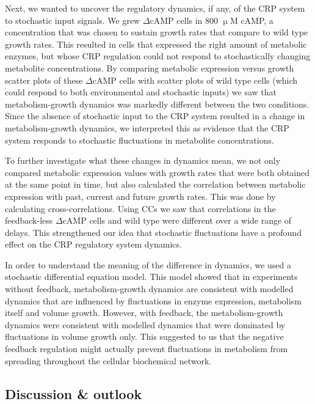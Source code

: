 Next, we wanted to 
uncover
the regulatory dynamics, if any, of the CRP system to stochastic input signals.
%
We grew  $\Delta$cAMP cells in 800 $\upmu$M cAMP,
a concentration that was chosen to sustain growth rates that compare to wild type growth rates.
%
This resulted in cells that expressed the right amount of metabolic enzymes, 
but whose CRP regulation could not respond to stochastically changing metabolite concentrations.
%
By comparing metabolic expression versus growth scatter plots of these $\Delta$cAMP cells with
scatter plots of wild type cells (which could respond to both environmental and stochastic inputs)  
we saw that metabolism-growth dynamics was markedly different between the two conditions.
%
Since the absence 
of stochastic input to the CRP system resulted in a change in metabolism-growth dynamics, 
we interpreted this as evidence that the CRP system responds to stochastic fluctuations in metabolite concentrations.

To further investigate what these changes in dynamics mean, 
we not only compared metabolic expression values with growth rates that were both obtained at the same point in time,
but also calculated the correlation between metabolic expression with past, current and future growth rates.
%
This was done by calculating cross-correlations.
%
Using CCs we saw that correlations in the feedback-less $\Delta$cAMP cells and wild type were different over a wide range of delays.
%
This strengthened our idea that stochastic fluctuations have a profound effect on the CRP regulatory system dynamics.

In order to understand the meaning of the difference in dynamics, we used a stochastic differential equation model.
%
This model showed that in experiments without feedback, metabolism-growth dynamics are consistent with modelled dynamics that are influenced by fluctuations in enzyme expression, metabolism itself and volume growth.
% 
However, with feedback, the metabolism-growth dynamics were consistent with modelled dynamics that were dominated by fluctuations in volume growth only.
%
This suggested to us that the negative feedback regulation might actually 
prevent fluctuations in metabolism from spreading throughout the cellular biochemical network.

\subsection*{Discussion & outlook}

